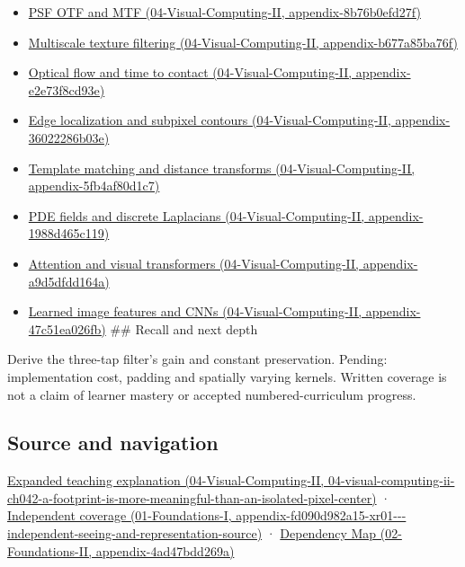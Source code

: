 \begin{itemize}
\item
  \href{../04-Visual-Computing-II/main.pdf\#nameddest=appendix-8b76b0efd27f}{PSF OTF and MTF (04-Visual-Computing-II, appendix-8b76b0efd27f)}
\item
  \href{../04-Visual-Computing-II/main.pdf\#nameddest=appendix-b677a85ba76f}{Multiscale texture filtering (04-Visual-Computing-II, appendix-b677a85ba76f)}
\item
  \href{../04-Visual-Computing-II/main.pdf\#nameddest=appendix-e2e73f8cd93e}{Optical flow and time to contact (04-Visual-Computing-II, appendix-e2e73f8cd93e)}
\item
  \href{../04-Visual-Computing-II/main.pdf\#nameddest=appendix-36022286b03e}{Edge localization and subpixel contours (04-Visual-Computing-II, appendix-36022286b03e)}
\item
  \href{../04-Visual-Computing-II/main.pdf\#nameddest=appendix-5fb4af80d1c7}{Template matching and distance transforms (04-Visual-Computing-II, appendix-5fb4af80d1c7)}
\item
  \href{../04-Visual-Computing-II/main.pdf\#nameddest=appendix-1988d465c119}{PDE fields and discrete Laplacians (04-Visual-Computing-II, appendix-1988d465c119)}
\item
  \href{../04-Visual-Computing-II/main.pdf\#nameddest=appendix-a9d5dfdd164a}{Attention and visual transformers (04-Visual-Computing-II, appendix-a9d5dfdd164a)}
\item
  \href{../04-Visual-Computing-II/main.pdf\#nameddest=appendix-47c51ea026fb}{Learned image features and CNNs (04-Visual-Computing-II, appendix-47c51ea026fb)} \#\# Recall and next depth
\end{itemize}

Derive the three-tap filter's gain and constant preservation. Pending: implementation cost, padding and spatially varying kernels. Written coverage is not a claim of learner mastery or accepted numbered-curriculum progress.

\subsection{Source and navigation}\label{appendix-d5b3c692d9f0-source-and-navigation}

\href{../04-Visual-Computing-II/main.pdf\#nameddest=04-visual-computing-ii-ch042-a-footprint-is-more-meaningful-than-an-isolated-pixel-center}{Expanded teaching explanation (04-Visual-Computing-II, 04-visual-computing-ii-ch042-a-footprint-is-more-meaningful-than-an-isolated-pixel-center)} · \href{../01-Foundations-I/main.pdf\#nameddest=appendix-fd090d982a15-xr01---independent-seeing-and-representation-source}{Independent coverage (01-Foundations-I, appendix-fd090d982a15-xr01-\/-\/-independent-seeing-and-representation-source)} · \href{../02-Foundations-II/main.pdf\#nameddest=appendix-4ad47bdd269a}{Dependency Map (02-Foundations-II, appendix-4ad47bdd269a)}

